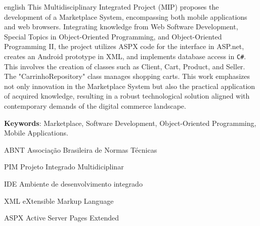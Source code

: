 \documentclass[
	12pt,				%
	openright,			%
	twoside,			%
	a4paper,			%
	english,			%
	brazil				%
	]{abntex2}
\newcommand{\listofquadrosname}{Lista de quadros}
\begin{document}
\begin{resumo}[Abstract]
 \begin{otherlanguage*}{english}
    This Multidisciplinary Integrated Project (MIP) proposes the development of a Marketplace System, encompassing both mobile applications and web browsers. Integrating knowledge from Web Software Development, Special Topics in Object-Oriented Programming, and Object-Oriented Programming II, the project utilizes ASPX code for the interface in ASP.net, creates an Android prototype in XML, and implements database access in \texttt{C\#}. This involves the creation of classes such as Client, Cart, Product, and Seller. The "CarrinhoRepository" class manages shopping carts. This work emphasizes not only innovation in the Marketplace System but also the practical application of acquired knowledge, resulting in a robust technological solution aligned with contemporary demands of the digital commerce landscape.

   \vspace{\onelineskip}
 
   \noindent 
   \textbf{Keywords}: Marketplace, Software Development, Object-Oriented Programming, Mobile Applications.
 \end{otherlanguage*}
\end{resumo}



\tableofcontents*
\cleardoublepage


\listoffigures*
\cleardoublepage

\pdfbookmark[0]{\listofquadrosname}{loq}
\listofquadros*
\cleardoublepage

\listoftables*
\cleardoublepage

\begin{siglas}
  \item[ABNT] Associação Brasileira de Normas Técnicas
  \item[PIM] Projeto Integrado Multidiciplinar
  \item[IDE] Ambiente de desenvolvimento integrado
  \item[XML] eXtensible Markup Language
  \item[ASPX] Active Server Pages Extended
\end{siglas}
\end{document}
